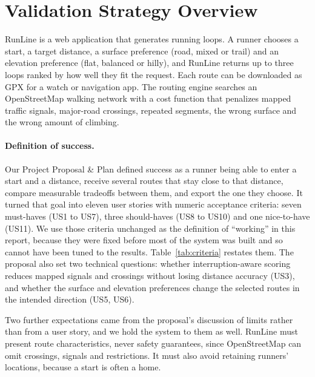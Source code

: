 \section{Validation Strategy Overview}

RunLine is a web application that generates running loops. A runner chooses a
start, a target distance, a surface preference (road, mixed or trail) and an
elevation preference (flat, balanced or hilly), and RunLine returns up to three
loops ranked by how well they fit the request. Each route can be downloaded as
GPX for a watch or navigation app. The routing engine searches an
OpenStreetMap walking network \citep{boeing2017osmnx,hagberg2008networkx} with
a cost function that penalizes mapped traffic signals, major-road crossings,
repeated segments, the wrong surface and the wrong amount of climbing.

\paragraph{Definition of success.}
Our Project Proposal \& Plan \citep{runguys2026proposal} defined success as a
runner being able to enter a start and a distance, receive several routes that
stay close to that distance, compare measurable tradeoffs between them, and
export the one they choose. It turned that goal into eleven user stories with
numeric acceptance criteria: seven must-haves (US1 to US7), three
should-haves (US8 to US10) and one nice-to-have (US11). We use those criteria
unchanged as the definition of ``working'' in this report, because they were
fixed before most of the system was built and so cannot have been tuned to
the results. Table~\ref{tab:criteria} restates them. The proposal also set two
technical questions: whether interruption-aware scoring reduces mapped
signals and crossings without losing distance accuracy (US3), and whether the
surface and elevation preferences change the selected routes in the intended
direction (US5, US6).

Two further expectations came from the proposal's discussion of limits rather
than from a user story, and we hold the system to them as well. RunLine must
present route characteristics, never safety guarantees, since OpenStreetMap
can omit crossings, signals and restrictions. It must also avoid retaining
runners' locations, because a start is often a home.

